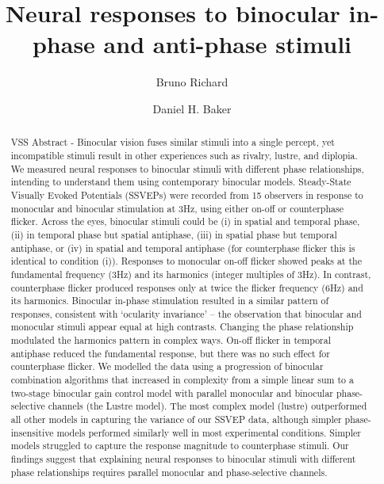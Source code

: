 \documentclass[
  12pt,
]{article}
\title{Neural responses to binocular in-phase and anti-phase stimuli}
\author[1]{Bruno Richard}
\author[2]{Daniel H. Baker}
\affil[1]{Department of Math and Computer Sciences, Rutgers
University, Newark, New Jersey, USA}
\affil[2]{Department of Psychology, University of York, York, UK}
\date{}
\begin{document}
\maketitle
\begin{abstract}
VSS Abstract - Binocular vision fuses similar stimuli into a single
percept, yet incompatible stimuli result in other experiences such as
rivalry, lustre, and diplopia. We measured neural responses to binocular
stimuli with different phase relationships, intending to understand them
using contemporary binocular models. Steady-State Visually Evoked
Potentials (SSVEPs) were recorded from 15 observers in response to
monocular and binocular stimulation at 3Hz, using either on-off or
counterphase flicker. Across the eyes, binocular stimuli could be (i) in
spatial and temporal phase, (ii) in temporal phase but spatial
antiphase, (iii) in spatial phase but temporal antiphase, or (iv) in
spatial and temporal antiphase (for counterphase flicker this is
identical to condition (i)). Responses to monocular on-off flicker
showed peaks at the fundamental frequency (3Hz) and its harmonics
(integer multiples of 3Hz). In contrast, counterphase flicker produced
responses only at twice the flicker frequency (6Hz) and its harmonics.
Binocular in-phase stimulation resulted in a similar pattern of
responses, consistent with `ocularity invariance' -- the observation
that binocular and monocular stimuli appear equal at high contrasts.
Changing the phase relationship modulated the harmonics pattern in
complex ways. On-off flicker in temporal antiphase reduced the
fundamental response, but there was no such effect for counterphase
flicker. We modelled the data using a progression of binocular
combination algorithms that increased in complexity from a simple linear
sum to a two-stage binocular gain control model with parallel monocular
and binocular phase-selective channels (the Lustre model). The most
complex model (lustre) outperformed all other models in capturing the
variance of our SSVEP data, although simpler phase-insensitive models
performed similarly well in most experimental conditions. Simpler models
struggled to capture the response magnitude to counterphase stimuli. Our
findings suggest that explaining neural responses to binocular stimuli
with different phase relationships requires parallel monocular and
phase-selective channels.
\end{abstract}
\end{document}
